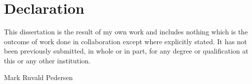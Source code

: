\chapter*{Declaration}

This dissertation is the result of my own work and includes nothing which is
the outcome of work done in collaboration except where explicitly stated. It
has not been previously submitted, in whole or in part, for any degree or
qualification at this or any other institution.

\vspace{2cm}
\noindent Mark Ruvald Pedersen

